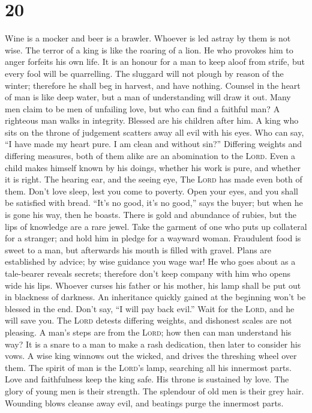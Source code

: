 \hypertarget{section-19}{%
\section{20}\label{section-19}}

 Wine is a mocker and beer is a brawler. Whoever is led
astray by them is not wise.  The terror of a king is like
the roaring of a lion. He who provokes him to anger forfeits his own
life.  It is an honour for a man to keep aloof from
strife, but every fool will be quarrelling.  The sluggard
will not plough by reason of the winter; therefore he shall beg in
harvest, and have nothing.  Counsel in the heart of man is
like deep water, but a man of understanding will draw it out.
 Many men claim to be men of unfailing love, but who can
find a faithful man?  A righteous man walks in integrity.
Blessed are his children after him.  A king who sits on
the throne of judgement scatters away all evil with his eyes.
 Who can say, ``I have made my heart pure. I am clean and
without sin?''  Differing weights and differing measures,
both of them alike are an abomination to the \textsc{Lord}.
 Even a child makes himself known by his doings, whether
his work is pure, and whether it is right.  The hearing
ear, and the seeing eye, The \textsc{Lord} has made even both of them.
 Don't love sleep, lest you come to poverty. Open your
eyes, and you shall be satisfied with bread.  ``It's no
good, it's no good,'' says the buyer; but when he is gone his way, then
he boasts.  There is gold and abundance of rubies, but
the lips of knowledge are a rare jewel.  Take the garment
of one who puts up collateral for a stranger; and hold him in pledge for
a wayward woman.  Fraudulent food is sweet to a man, but
afterwards his mouth is filled with gravel.  Plans are
established by advice; by wise guidance you wage war!  He
who goes about as a tale-bearer reveals secrets; therefore don't keep
company with him who opens wide his lips.  Whoever curses
his father or his mother, his lamp shall be put out in blackness of
darkness.  An inheritance quickly gained at the beginning
won't be blessed in the end.  Don't say, ``I will pay
back evil.'' Wait for the \textsc{Lord}, and he will save you.
 The \textsc{Lord} detests differing weights, and
dishonest scales are not pleasing.  A man's steps are
from the \textsc{Lord}; how then can man understand his way?
 It is a snare to a man to make a rash dedication, then
later to consider his vows.  A wise king winnows out the
wicked, and drives the threshing wheel over them.  The
spirit of man is the \textsc{Lord}'s lamp, searching all his innermost
parts.  Love and faithfulness keep the king safe. His
throne is sustained by love.  The glory of young men is
their strength. The splendour of old men is their grey hair.
 Wounding blows cleanse away evil, and beatings purge the
innermost parts.

